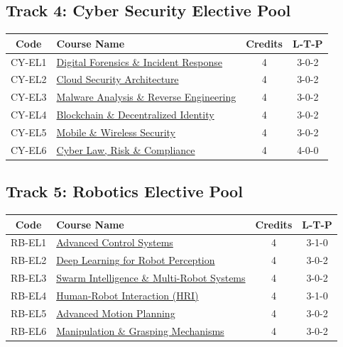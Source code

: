 \newpage
\subsection*{Track 4: Cyber Security Elective Pool}
\begin{longtable}{|c|p{8cm}|c|c|}
\hline
\textbf{Code} & \textbf{Course Name} & \textbf{Credits} & \textbf{L-T-P} \\
\hline
CY-EL1 & \hyperref[elec:CY_1]{Digital Forensics \& Incident Response} & 4 & 3-0-2 \\
\hline
CY-EL2 & \hyperref[elec:CY_2]{Cloud Security Architecture} & 4 & 3-0-2 \\
\hline
CY-EL3 & \hyperref[elec:CY_3]{Malware Analysis \& Reverse Engineering} & 4 & 3-0-2 \\
\hline
CY-EL4 & \hyperref[elec:CY_4]{Blockchain \& Decentralized Identity} & 4 & 3-0-2 \\
\hline
CY-EL5 & \hyperref[elec:CY_5]{Mobile \& Wireless Security} & 4 & 3-0-2 \\
\hline
CY-EL6 & \hyperref[elec:CY_6]{Cyber Law, Risk \& Compliance} & 4 & 4-0-0 \\
\hline
\end{longtable}

\subsection*{Track 5: Robotics Elective Pool}
\begin{longtable}{|c|p{8cm}|c|c|}
\hline
\textbf{Code} & \textbf{Course Name} & \textbf{Credits} & \textbf{L-T-P} \\
\hline
RB-EL1 & \hyperref[elec:RB_1]{Advanced Control Systems} & 4 & 3-1-0 \\
\hline
RB-EL2 & \hyperref[elec:RB_2]{Deep Learning for Robot Perception} & 4 & 3-0-2 \\
\hline
RB-EL3 & \hyperref[elec:RB_3]{Swarm Intelligence \& Multi-Robot Systems} & 4 & 3-0-2 \\
\hline
RB-EL4 & \hyperref[elec:RB_4]{Human-Robot Interaction (HRI)} & 4 & 3-1-0 \\
\hline
RB-EL5 & \hyperref[elec:RB_5]{Advanced Motion Planning} & 4 & 3-0-2 \\
\hline
RB-EL6 & \hyperref[elec:RB_6]{Manipulation \& Grasping Mechanisms} & 4 & 3-0-2 \\
\hline
\end{longtable}

